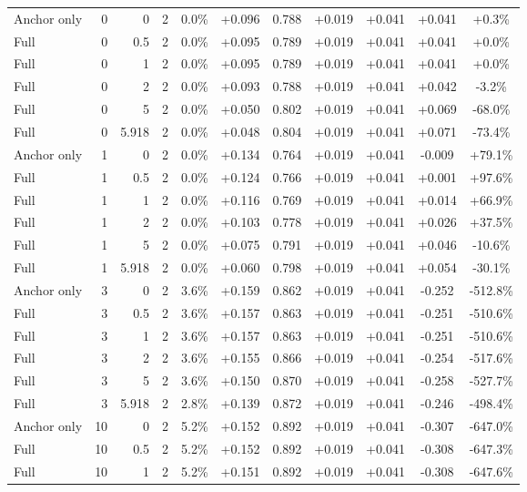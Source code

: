 \begin{table}[htbp]
\begin{tabular}{lrrrccccccc}
Anchor only & 0 & 0 & 2 & 0.0\% & +0.096 & 0.788 & +0.019 & +0.041 & +0.041 & +0.3\% \\
Full & 0 & 0.5 & 2 & 0.0\% & +0.095 & 0.789 & +0.019 & +0.041 & +0.041 & +0.0\% \\
Full & 0 & 1 & 2 & 0.0\% & +0.095 & 0.789 & +0.019 & +0.041 & +0.041 & +0.0\% \\
Full & 0 & 2 & 2 & 0.0\% & +0.093 & 0.788 & +0.019 & +0.041 & +0.042 & -3.2\% \\
Full & 0 & 5 & 2 & 0.0\% & +0.050 & 0.802 & +0.019 & +0.041 & +0.069 & -68.0\% \\
Full & 0 & 5.918 & 2 & 0.0\% & +0.048 & 0.804 & +0.019 & +0.041 & +0.071 & -73.4\% \\
Anchor only & 1 & 0 & 2 & 0.0\% & +0.134 & 0.764 & +0.019 & +0.041 & -0.009 & +79.1\% \\
Full & 1 & 0.5 & 2 & 0.0\% & +0.124 & 0.766 & +0.019 & +0.041 & +0.001 & +97.6\% \\
Full & 1 & 1 & 2 & 0.0\% & +0.116 & 0.769 & +0.019 & +0.041 & +0.014 & +66.9\% \\
Full & 1 & 2 & 2 & 0.0\% & +0.103 & 0.778 & +0.019 & +0.041 & +0.026 & +37.5\% \\
Full & 1 & 5 & 2 & 0.0\% & +0.075 & 0.791 & +0.019 & +0.041 & +0.046 & -10.6\% \\
Full & 1 & 5.918 & 2 & 0.0\% & +0.060 & 0.798 & +0.019 & +0.041 & +0.054 & -30.1\% \\
Anchor only & 3 & 0 & 2 & 3.6\% & +0.159 & 0.862 & +0.019 & +0.041 & -0.252 & -512.8\% \\
Full & 3 & 0.5 & 2 & 3.6\% & +0.157 & 0.863 & +0.019 & +0.041 & -0.251 & -510.6\% \\
Full & 3 & 1 & 2 & 3.6\% & +0.157 & 0.863 & +0.019 & +0.041 & -0.251 & -510.6\% \\
Full & 3 & 2 & 2 & 3.6\% & +0.155 & 0.866 & +0.019 & +0.041 & -0.254 & -517.6\% \\
Full & 3 & 5 & 2 & 3.6\% & +0.150 & 0.870 & +0.019 & +0.041 & -0.258 & -527.7\% \\
Full & 3 & 5.918 & 2 & 2.8\% & +0.139 & 0.872 & +0.019 & +0.041 & -0.246 & -498.4\% \\
Anchor only & 10 & 0 & 2 & 5.2\% & +0.152 & 0.892 & +0.019 & +0.041 & -0.307 & -647.0\% \\
Full & 10 & 0.5 & 2 & 5.2\% & +0.152 & 0.892 & +0.019 & +0.041 & -0.308 & -647.3\% \\
Full & 10 & 1 & 2 & 5.2\% & +0.151 & 0.892 & +0.019 & +0.041 & -0.308 & -647.6\% \\

\end{tabular}
\end{table}
